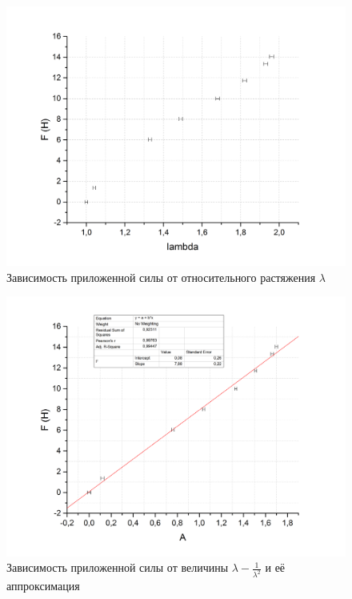 \documentclass[a4paper,12pt]{article}
\newcounter{first}
\begin{document}
\setcounter{figure}{0}
\setcounter{first}{1}
\renewcommand{\figurename}{График}

\begin{figure}[htpb!]
\centering
\includegraphics[width=150mm]{graph1_1.jpg}
\caption{Зависимость приложенной силы от относительного растяжения $\lambda$}
\end{figure}

\begin{figure}[htpb!]
\centering
\includegraphics[width=150mm]{graph1_2.jpg}
\caption{Зависимость приложенной силы от величины $\lambda - \frac{1}{\lambda^2}$ и её аппроксимация }
\end{figure}
\end{document}
